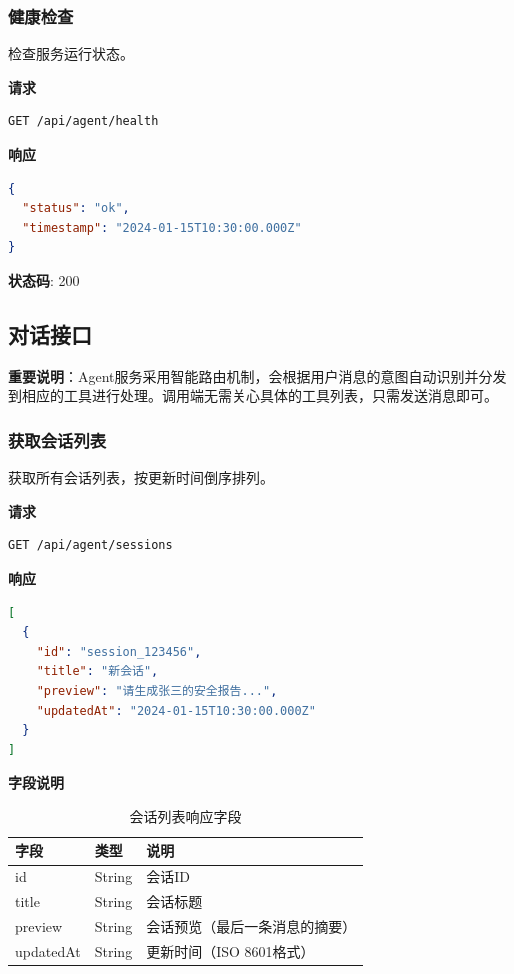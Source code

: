 \documentclass[12pt,a4paper]{article}
\begin{document}
\subsubsection{健康检查}

检查服务运行状态。

\textbf{请求}

\begin{lstlisting}[language=bash]
GET /api/agent/health
\end{lstlisting}

\textbf{响应}

\begin{lstlisting}[language=json]
{
  "status": "ok",
  "timestamp": "2024-01-15T10:30:00.000Z"
}
\end{lstlisting}

\textbf{状态码}: 200

\subsection{对话接口}

\textbf{重要说明}：Agent服务采用智能路由机制，会根据用户消息的意图自动识别并分发到相应的工具进行处理。调用端无需关心具体的工具列表，只需发送消息即可。

\subsubsection{获取会话列表}

获取所有会话列表，按更新时间倒序排列。

\textbf{请求}

\begin{lstlisting}[language=bash]
GET /api/agent/sessions
\end{lstlisting}

\textbf{响应}

\begin{lstlisting}[language=json]
[
  {
    "id": "session_123456",
    "title": "新会话",
    "preview": "请生成张三的安全报告...",
    "updatedAt": "2024-01-15T10:30:00.000Z"
  }
]
\end{lstlisting}

\textbf{字段说明}

\begin{table}[h]
  \centering
  \begin{tabular}{lll}
    \toprule
    字段 & 类型 & 说明 \\
    \midrule
    id & String & 会话ID \\
    title & String & 会话标题 \\
    preview & String & 会话预览（最后一条消息的摘要） \\
    updatedAt & String & 更新时间（ISO 8601格式） \\
    \bottomrule
  \end{tabular}
  \caption{会话列表响应字段}
\end{table}
\end{document}
